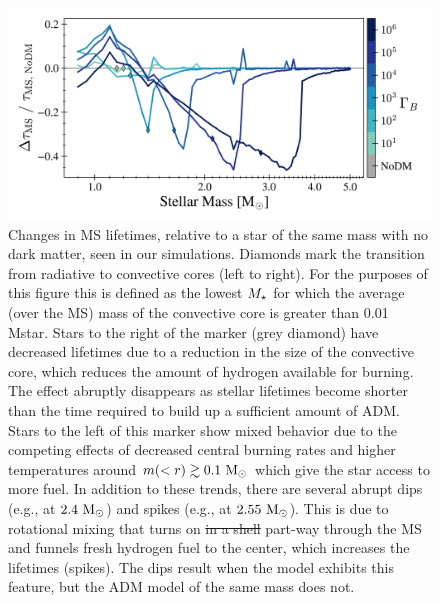 \documentclass[useAMS,usenatbib]{mnras}
\providecommand{\DIFadd}[1]{{\protect\color{blue}\uwave{#1}}} %
\providecommand{\DIFdel}[1]{{\protect\color{red}\sout{#1}}}                      %
\providecommand{\DIFaddbegin}{} %
\providecommand{\DIFdelend}{} %
\providecommand{\DIFdelFL}[1]{\DIFdel{#1}} %
\providecommand{\DIFdelbeginFL}{} %
\providecommand{\DIFdelendFL}{} %
\newcommand{\DIFscaledelfig}{0.5}
\newlength{\DIFdelgraphicswidth} %
\newlength{\DIFdelgraphicsheight} %
\newcommand{\DIFaddincludegraphics}[2][]{{\color{blue}\fbox{\DIFOincludegraphics[#1]{#2}}}} %
\newcommand{\DIFdelincludegraphics}[2][]{%
\sbox{\DIFdelgraphicsbox}{\DIFOincludegraphics[#1]{#2}}%
\settoboxwidth{\DIFdelgraphicswidth}{\DIFdelgraphicsbox} %
\settoboxtotalheight{\DIFdelgraphicsheight}{\DIFdelgraphicsbox} %
\scalebox{\DIFscaledelfig}{%
\parbox[b]{\DIFdelgraphicswidth}{\usebox{\DIFdelgraphicsbox}\\[-\baselineskip] \rule{\DIFdelgraphicswidth}{0em}}\llap{\resizebox{\DIFdelgraphicswidth}{\DIFdelgraphicsheight}{%
\setlength{\unitlength}{\DIFdelgraphicswidth}%
\begin{picture}(1,1)%
\thicklines\linethickness{2pt} %
{\color[rgb]{1,0,0}\put(0,0){\framebox(1,1){}}}%
{\color[rgb]{1,0,0}\put(0,0){\line( 1,1){1}}}%
{\color[rgb]{1,0,0}\put(0,1){\line(1,-1){1}}}%
\end{picture}%
}\hspace*{3pt}}} %
} %
\DeclareRobustCommand{\DIFaddbegin}{\DIFOaddbegin \let\includegraphics\DIFaddincludegraphics} %
\DeclareRobustCommand{\DIFdelend}{\DIFOaddend \let\includegraphics\DIFOincludegraphics} %
\DeclareRobustCommand{\DIFdelbeginFL}{\DIFOdelbeginFL \let\includegraphics\DIFdelincludegraphics} %
\DeclareRobustCommand{\DIFdelendFL}{\DIFOaddendFL \let\includegraphics\DIFOincludegraphics} %
\begin{document}
\DIFdelend %
\begin{figure}
  \centering
  \includegraphics[width=\textwidth]{plots/MStau.png}
  \caption{Changes in MS lifetimes, relative to a star of the same mass with no dark matter, seen in our simulations.
  Diamonds mark the transition from radiative to convective cores (left to right). For the purposes of this figure this is defined as the lowest $M_{\star}$ for which the average (over the MS) mass of the convective core is greater than 0.01 Mstar. Stars to the right of the \nodm marker (grey diamond) have decreased lifetimes due to a reduction in the size of the convective core, which reduces the amount of hydrogen available for burning. The effect abruptly disappears as stellar lifetimes become shorter than the time required to build up a sufficient amount of ADM. Stars to the left of this marker show mixed behavior due to the competing effects of decreased central burning rates and higher temperatures around $m(<r) \gtrsim 0.1 \ \mathrm{M}_{\odot}$ which give the star access to more fuel. In addition to these trends, there are several abrupt dips (e.g., at $2.4 \ \mathrm{M}_{\odot}$) and spikes (e.g., at $2.55 \ \mathrm{M}_{\odot}$). This is due to rotational mixing that turns on \DIFdelbeginFL \DIFdelFL{in a shell }\DIFdelendFL part-way through the MS and funnels fresh hydrogen fuel to the center, which increases the lifetimes (spikes). The dips result when the \nodm model exhibits this feature, but the ADM model of the same mass does not.
  }
  \label{fig:mstau}
\end{figure}

\DIFaddbegin \subsection{\DIFadd{Main Sequence Lifetimes}}
\label{sub:mstau}
\end{document}
